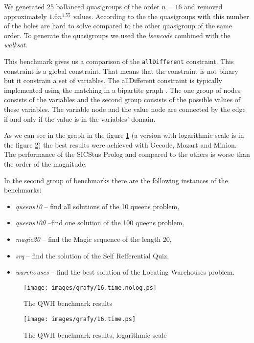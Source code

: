 We generated 25 ballanced quasigroups of the 
order $n = 16$ and removed approximately $1.6 n^{1.55}$ values. According to the 
\cite{Achlioptas00generatingsatisfiable} the quasigroups with this number of the 
holes are hard to solve compared to the other quasigroup of the same order. To 
generate the quasigroups we used the {\em lsencode} combined with the {\em walksat}.
 
This benchmark gives us a comparison of the \texttt{allDifferent} constraint. This 
constraint is a global constraint. That means that the constraint is not binary but
it constrain a set of variables. The allDifferent constraint is typically implemented
using the matching in a bipartite graph \cite{hoeve:alldifferent}. The one group of nodes consists of the 
variables and the second group consists of the possible values of these variables.
The variable node and the value node are connected by the edge if and only if
the value is in the variables' domain. 

As we can see in the graph in the figure \ref{results:qwh1} (a version with logarithmic 
scale is in the figure \ref{results:qwh2}) the best results were achieved with Gecode,
Mozart and Minion. The performance of the SICStus Prolog and \eclipse compared to
the others is worse than the order of the magnitude.
  
In the second group of benchmarks there are the following instances of the benchmarks:

\begin{itemize}
  \item {\em queens10} -- find all solutions of the 10 queens problem,
  \item {\em queens100} --find one solution of the 100 queens problem, 
  \item {\em magic20} -- find the Magic sequence of the length 20,
  \item {\em srq} -- find the solution of the Self Refferential Quiz,
  \item {\em warehouses} -- find the best solution of the Locating Warehouses problem.
\end{itemize}


\begin{figure}
  \centering
  \texttt{[image: images/grafy/16.time.nolog.ps]}
  \caption{The QWH benchmark results}
  \label{results:qwh1}
\end{figure}

\begin{figure}
  \centering
  \texttt{[image: images/grafy/16.time.ps]}
  \caption{The QWH benchmark results, logarithmic scale}
  \label{results:qwh2}
\end{figure}

